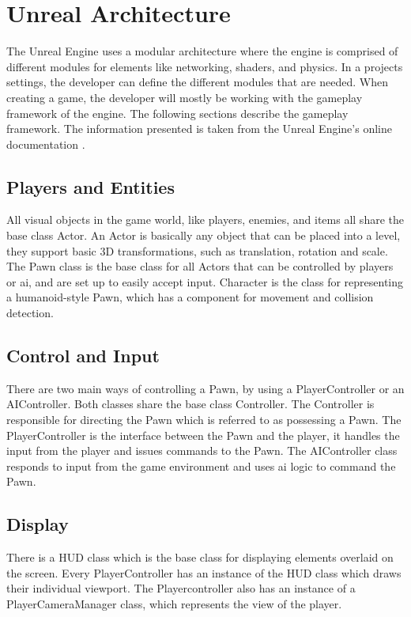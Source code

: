 \section{Unreal Architecture}
The Unreal Engine uses a modular architecture where the engine is comprised of different modules for elements like networking, shaders, and physics. In a projects settings, the developer can define the different modules that are needed. When creating a game, the developer will mostly be working with the gameplay framework of the engine. The following sections describe the gameplay framework. The information presented is taken from the Unreal Engine's online documentation \cite{epicgames2016doc}.

\subsection{Players and Entities}
All visual objects in the game world, like players, enemies, and items all share the base class Actor. An Actor is basically any object that can be placed into a level, they support basic 3D transformations, such as translation, rotation and scale. The Pawn class is the base class for all Actors that can be controlled by players or \gls{ai}, and are set up to easily accept input. Character is the class for representing a humanoid-style Pawn, which has a component for movement and collision detection.

\subsection{Control and Input}
There are two main ways of controlling a Pawn, by using a PlayerController or an AIController. Both classes share the base class Controller. The Controller is responsible for directing the Pawn which is referred to as possessing a Pawn. The PlayerController is the interface between the Pawn and the player, it handles the input from the player and issues commands to the Pawn. The AIController class responds to input from the game environment and uses \gls{ai} logic to command the Pawn.

\subsection{Display}
There is a HUD class which is the base class for displaying elements overlaid on the screen. Every PlayerController has an instance of the HUD class which draws their individual viewport. The Playercontroller also has an instance of a PlayerCameraManager class, which represents the view of the player.

